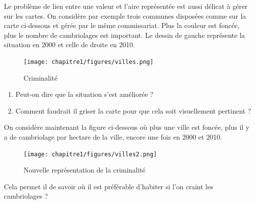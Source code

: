 \documentclass[10pt, a4paper]{article}
\begin{document}
\begin{tcolorbox}[lefttitle=2cm, colframe=gray!75!black, colback=white, title=\textbf{EXERCICE 2 : Analyse de trois datavisualisations de données.}]




Le problème de lien entre une valeur et l’aire représentée est aussi délicat à gérer sur les cartes. On
considère par exemple trois communes disposées comme sur la carte ci-dessous et gérée par le même commissariat.
Plus la couleur est foncée, plus le nombre de cambriolages est important. Le dessin de gauche représente la situation
en 2000 et celle de droite en 2010.

\begin{figure}[H]
    \centering
    \texttt{[image: chapitre1/figures/villes.png]}
    \caption{Criminalité}
    \label{fig:crim1}
\end{figure}
\begin{tcolorbox}[lefttitle=2cm, colback=white, colframe=gray!95!black, title=\textbf{EXERCICE 2.1 : Analyse de la Figure~\ref{fig:crim1}}]
\begin{enumerate}
    \item Peut-on dire que la situation s’est améliorée ? 
    \item Comment faudrait il griser la carte pour que cela soit visuellement
pertinent ?
\end{enumerate}
\vspace{1.5cm}
\end{tcolorbox}

\begin{tcolorbox}[lefttitle=2cm, colback=white,colframe=gray!95!black, title=\textbf{EXERCICE 2.2 : Nouvelle analyse}]
On considère maintenant la figure ci-dessous où plus une ville est foncée, plus il y a de cambriolage par hectare de la ville, encore une fois en 2000 et 2010.

\begin{figure}[H]
    \centering
    \texttt{[image: chapitre1/figures/villes2.png]}
    \caption{Nouvelle représentation de la criminalité}
    \label{fig:enter-label}
\end{figure}


Cela permet il de savoir où il est préférable d’habiter si l’on craint
les cambriolages ?
\vspace{2cm}

\end{tcolorbox}






\end{tcolorbox}
\end{document}
